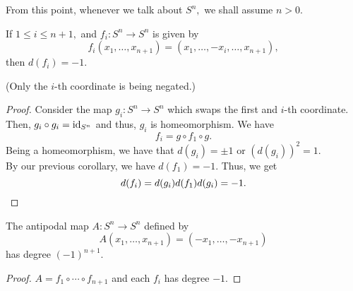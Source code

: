 \documentclass[12pt]{article}
\newenvironment{blockquote}
{\begin{mdframed}[skipabove=0pt, skipbelow=0pt, innertopmargin=4pt, innerbottommargin=4pt, bottomline=false,topline=false,rightline=false, linewidth=2pt]}
{\end{mdframed}}
\begin{document}
\begin{blockquote}
	From this point, whenever we talk about $S^n,$ we shall assume $n > 0.$
\end{blockquote}

\begin{cor}
	If $1 \le i \le n + 1,$ and $f_i:S^n\to S^n$ is given by
	\begin{equation*} 
		f_i(x_1, \ldots, x_{n+1}) = (x_1, \ldots, -x_i, \ldots, x_{n+1}),
	\end{equation*}
	then $d(f_i) = -1.$
\end{cor}
(Only the $i$-th coordinate is being negated.)
\begin{proof} 
	Consider the map $g_i:S^n \to S^n$ which swaps the first and $i$-th coordinate. Then, $g_i\circ g_i = \operatorname{id}_{S^n}$ and thus, $g_i$ is homeomorphism.
	We have
	\begin{equation*} 
		f_i = g \circ f_1 \circ g.
	\end{equation*}
	Being a homeomorphism, we have that $d(g_i) = \pm 1$ or $(d(g_i))^2 = 1.$ \\
	By our previous corollary, we have $d(f_1) = -1.$ Thus, we get
	\begin{equation*} 
		d(f_i) = d(g_i)d(f_1)d(g_i) = -1. \qedhere
	\end{equation*}
\end{proof}

\begin{cor}
	The antipodal map $A:S^n \to S^n$ defined by
	\begin{equation*} 
		A(x_1, \ldots, x_{n+1}) = (-x_1, \ldots, -x_{n+1})
	\end{equation*}	
	has degree $(-1)^{n+1}.$
\end{cor}
\begin{proof} 
	$A = f_1 \circ \cdots \circ f_{n+1}$ and each $f_i$ has degree $-1.$
\end{proof}
\end{document}
